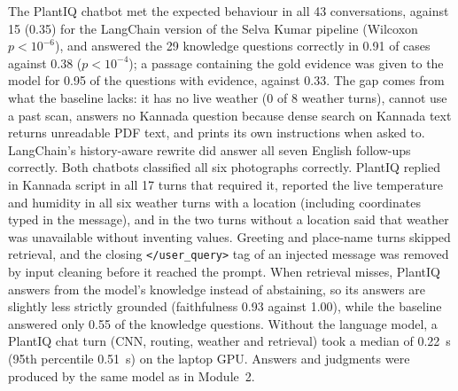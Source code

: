 The PlantIQ chatbot met the expected behaviour in all 43 conversations, against 15 (0.35) for the LangChain version of
the Selva Kumar pipeline (Wilcoxon $p<10^{-6}$), and answered the 29 knowledge questions correctly in 0.91 of cases
against 0.38 ($p<10^{-4}$); a passage containing the gold evidence was given to the model for 0.95 of the questions
with evidence, against 0.33. The gap comes from what the baseline lacks: it has no live weather (0 of 8 weather turns),
cannot use a past scan, answers no Kannada question because dense search on Kannada text returns unreadable PDF text,
and prints its own instructions when asked to. LangChain's history-aware rewrite did answer all seven English follow-ups
correctly. Both chatbots classified all six photographs correctly. PlantIQ replied in Kannada script in all 17 turns
that required it, reported the live temperature and humidity in all six weather turns with a location (including
coordinates typed in the message), and in the two turns without a location said that weather was unavailable without
inventing values. Greeting and place-name turns skipped retrieval, and the closing \texttt{</user\_query>} tag of an
injected message was removed by input cleaning before it reached the prompt. When retrieval misses, PlantIQ answers from
the model's knowledge instead of abstaining, so its answers are slightly less strictly grounded (faithfulness 0.93
against 1.00), while the baseline answered only 0.55 of the knowledge questions. Without the language model, a PlantIQ
chat turn (CNN, routing, weather and retrieval) took a median of 0.22~s (95th percentile 0.51~s) on the laptop GPU.
Answers and judgments were produced by the same model as in Module~2.


